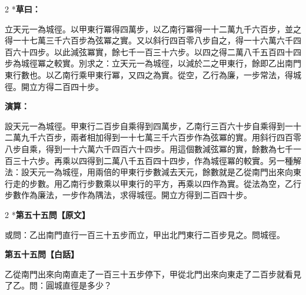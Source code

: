 \documentclass[11pt,a4paper]{article}
\begin{document}
\begin{paracol}{2}
\switchcolumn[0]*\textbf{草曰：}

\small 立天元一為城徑。以甲東行冪得四萬步，以乙南行冪得一十二萬九千六百步，並之得一十七萬三千六百步為弦冪之實。又以斜行四百零八步自之，得一十六萬六千四百六十四步。以此減弦冪實，餘七千一百三十六步。以四之得二萬八千五百四十四步為城徑冪之較實。別求之：立天元一為城徑，以減於二之甲東行，餘即乙出南門東行數也。以乙南行乘甲東行冪，又四之為實。從空，乙行為廉，一步常法，得城徑。開立方得二百四十步。

\switchcolumn\textbf{演算：}

\small 設天元一為城徑。甲東行二百步自乘得到四萬步，乙南行三百六十步自乘得到一十二萬九千六百步，兩者相加得到一十七萬三千六百步作為弦冪的實。用斜行四百零八步自乘，得到一十六萬六千四百六十四步。用這個數減弦冪的實，餘數為七千一百三十六步。再乘以四得到二萬八千五百四十四步，作為城徑冪的較實。另一種解法：設天元一為城徑，用兩倍的甲東行步數減去天元，餘數就是乙從南門出來向東行走的步數。用乙南行步數乘以甲東行的平方，再乘以四作為實。從法為空，乙行步數作為廉法，一步作為隅法，求得城徑。開立方得到二百四十步。
\end{paracol}

\vspace{0.1cm}
\noindent{}
\par\vspace{0.3cm}

\begin{paracol}{2}
\switchcolumn[0]*\noindent\textbf{第五十五問【原文】}

\small 或問：乙出南門直行一百三十五步而立，甲出北門東行二百步見之。問城徑。

\switchcolumn\noindent\textbf{第五十五問【白話】}

\small 乙從南門出來向南直走了一百三十五步停下，甲從北門出來向東走了二百步就看見了乙。問：圓城直徑是多少？
\end{paracol}

\vspace{0.1cm}
\noindent{}
\par\vspace{0.15cm}
\end{document}
